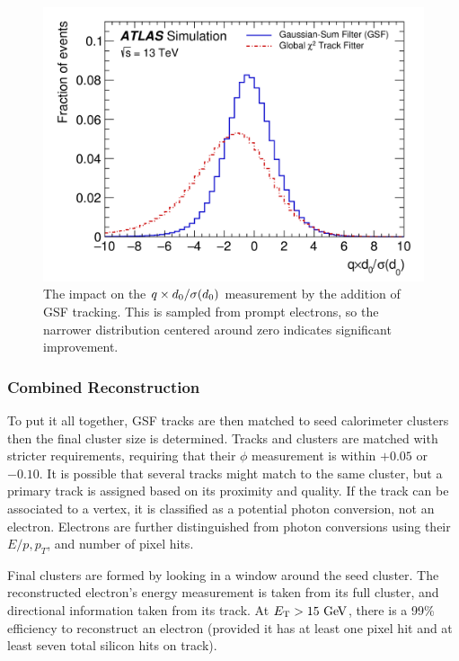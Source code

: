 \begin{figure}[htbp]
\centering
\includegraphics[width=.7\textwidth]{figures/EventReconstruction/elec-qxd0.png}
\caption{The impact on the $q \times d_{0} /\sigma(d_{0})$ measurement by the addition of \ac{GSF} tracking. This is sampled from prompt electrons, so the narrower distribution centered around zero indicates significant improvement.}
\label{fig:elec_gsf}
\end{figure}


\subsubsection{Combined Reconstruction}
To put it all together, \ac{GSF} tracks are then matched to seed calorimeter clusters then the final cluster size is determined. Tracks and clusters are matched with stricter requirements, requiring that their $\phi$ measurement is within $+0.05$ or $-0.10$. It is possible that several tracks might match to the same cluster, but a primary track is assigned based on its proximity and quality. If the track can be associated to a vertex, it is classified as a potential photon conversion, not an electron. Electrons are further distinguished from photon conversions using their $E/p, p_{T}$, and number of pixel hits. 

Final clusters are formed by looking in a window around the seed cluster. The reconstructed electron's energy measurement is taken from its full cluster, and directional information taken from its track. At $\et > 15 \GeV$, there is a 99\% efficiency to reconstruct an electron (provided it has at least one pixel hit and at least seven total silicon hits on track). 

